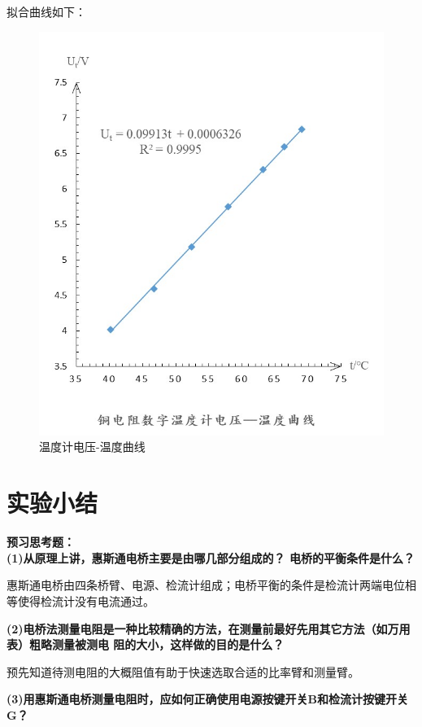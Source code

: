 \documentclass[UTF8]{ctexart}
\begin{document}
拟合曲线如下：
\begin{figure}[ht]
    \centering
    \includegraphics[scale=0.7]{温度计电压温度曲线.jpg}
    \caption{温度计电压-温度曲线}
    \label{fig:label}
\end{figure}


\section{实验小结}
\noindent  \textbf{预习思考题：}\\

\noindent  \textbf{(1)从原理上讲，惠斯通电桥主要是由哪几部分组成的？ 电桥的平衡条件是什么？}

惠斯通电桥由四条桥臂、电源、检流计组成；电桥平衡的条件是检流计两端电位相等使得检流计没有电流通过。

\noindent  \textbf{(2)电桥法测量电阻是一种比较精确的方法，在测量前最好先用其它方法（如万用表）粗略测量被测电
阻的大小，这样做的目的是什么？}

预先知道待测电阻的大概阻值有助于快速选取合适的比率臂和测量臂。

\noindent  \textbf{(3)用惠斯通电桥测量电阻时，应如何正确使用电源按键开关B和检流计按键开关G？}
\end{document}
